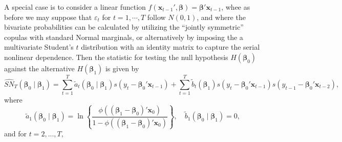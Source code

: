 \documentclass[harvard,11pt]{article}
\begin{document}
A special case is to consider a linear function $f(\bm{x}_{t-1}',\bm{\beta})=\bm{\beta}'\bm{x}_{t-1}$, whee as before we may suppose that $\varepsilon_{t}$ for $t=1,\cdots,T$ follow $N(0,1)$, and where the bivariate probabilities can be calculated by utilizing the \textquotedblleft jointly symmetric\textquotedblright{ }copulas with standard Normal marginals, or alternatively by imposing the a multivariate Student's $t$ distribution with an identity matrix to capture the serial nonlinear dependence. Then the statistic for testing the null hypothesis $H(\bm{\beta}_0)$ against the alternative $H(\bm{\beta}_1)$ is given by
\begin{equation*}
\widehat{SN}_{T}(\bm{\beta}_{0}\mid\bm{\beta}_{1})=\sum\limits_{t=1}^{T}\tilde{a}%
_{t}(\bm{\beta}_{0}\mid\bm{\beta}_{1})s(y_{t}-\bm{\beta}_0'\bm{x}_{t-1})+\sum\limits_{t=1}^{T}\tilde{b}_{t}(\bm{\beta}_{1})%
s(y_{t}-\bm{\beta}_0'\bm{x}_{t-1})s(y_{t-1}-\bm{\beta}_0'\bm{x}_{t-2}),
\end{equation*}%
where%
\begin{equation*}
\tilde{a}_{1}(\bm{\beta}_{0}\mid\bm{\beta}_{1})=\ln \left\{ \frac{\phi\left(\left(\bm{\beta}_1-\bm{\beta}_0\right)'\bm{x}_0\right) }{1-\phi\left(\left(\bm{\beta}_1-\bm{\beta}_0\right)'\bm{x}_0\right) }\right\} ,\quad%
\tilde{b}_{1}(\bm{\beta}_{0}\mid\bm{\beta}_{1})=0,
\end{equation*}%
and for $t=2,...,T,$%
\end{document}
